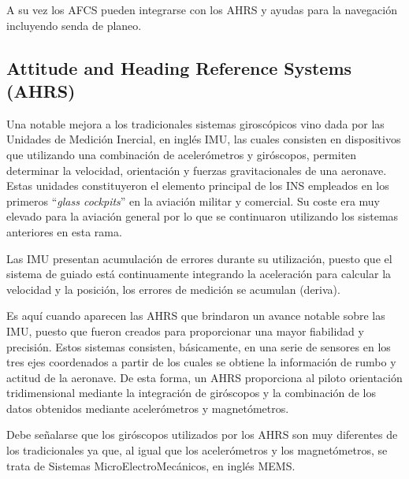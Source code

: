 A su vez los \ac{AFCS} pueden integrarse con los \ac{AHRS} y ayudas para la navegaci\'on incluyendo senda de planeo. 

\subsection{  Attitude and Heading Reference Systems (AHRS) }
\label{sec:07.AHRS}


Una notable mejora a los tradicionales sistemas giroscópicos vino dada por las Unidades de Medición Inercial, en ingl\'es \ac{IMU}, las cuales consisten en dispositivos que utilizando una combinación de acelerómetros y giróscopos, permiten determinar la velocidad, orientación y fuerzas gravitacionales de una aeronave.
Estas unidades constituyeron el elemento principal de los \ac{INS} empleados  en los primeros ``\emph{glass cockpits}'' en la aviaci\'on militar y comercial. Su coste era muy elevado para la aviación general por lo que  se continuaron utilizando los sistemas anteriores en esta rama.

Las \ac{IMU} presentan acumulación de errores durante su utilización,  puesto que el sistema de guiado está continuamente integrando la aceleración para calcular la velocidad y la posición, los errores de medición se acumulan (deriva).

Es aqu\'i cuando aparecen las \ac{AHRS} que brindaron un  avance notable sobre las \ac{IMU}, puesto que fueron creados para proporcionar una mayor fiabilidad y precisión. Estos sistemas consisten,  básicamente, en una serie de sensores en los tres ejes coordenados a partir de los cuales se obtiene la información de rumbo y actitud de la aeronave.
De esta forma, un AHRS proporciona al piloto orientación tridimensional mediante la integración de gir\'oscopos y la combinación de los datos obtenidos mediante acelerómetros y magnetómetros. 

Debe señalarse que los gir\'oscopos utilizados por los AHRS son muy diferentes de los tradicionales ya que, al igual que los acelerómetros y los magnetómetros, se trata de Sistemas MicroElectroMecánicos, en ingl\'es \ac{MEMS}. 

